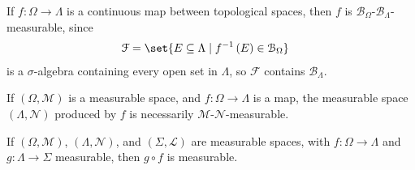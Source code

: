 \begin{example}
  If $f\colon \Omega\rightarrow \Lambda$ is a continuous map between topological spaces, then $f$ is $\mathcal{B}_{\Omega}$-$\mathcal{B}_{\Lambda}$-measurable, since
  \begin{align*}
    \mathcal{F} &= \set{E\subseteq \Lambda\mid f^{-1}\left(E\right)\in \mathcal{B}_{\Omega}}
  \end{align*}
  is a $\sigma$-algebra containing every open set in $\Lambda$, so $\mathcal{F}$ contains $\mathcal{B}_{\Lambda}$.
\end{example}

\begin{example}
  If $\left(\Omega,\mathcal{M}\right)$ is a measurable space, and $f\colon \Omega\rightarrow \Lambda$ is a map, the measurable space $\left(\Lambda,\mathcal{N}\right)$ produced by $f$ is necessarily $\mathcal{M}$-$\mathcal{N}$-measurable.
\end{example}

\begin{fact}
  If $\left(\Omega,\mathcal{M}\right)$, $\left(\Lambda,\mathcal{N}\right)$, and $\left(\Sigma,\mathcal{L}\right)$ are measurable spaces, with $f\colon \Omega\rightarrow \Lambda$ and $g\colon \Lambda\rightarrow \Sigma$ measurable, then $g\circ f$ is measurable.\label{fact:composition}
\end{fact}

